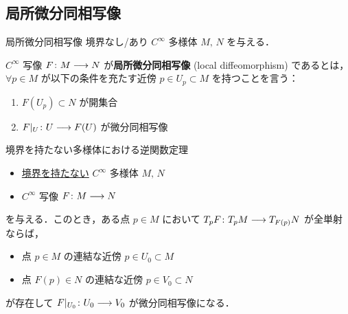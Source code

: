 \documentclass[TQFT_main]{subfiles}
\begin{document}
\subsection{局所微分同相写像}

\begin{mydef}[label=def:loc-diffeo]{局所微分同相写像}
    境界なし/あり $C^\infty$ 多様体 $M,\, N$ を与える．
    
    $C^\infty$ 写像 $F \colon M \longrightarrow N$ が\textbf{局所微分同相写像} (local diffeomorphism) であるとは，
    $\forall p \in M$ が以下の条件を充たす近傍 $p \in U_p \subset M$ を持つことを言う：
    \begin{enumerate}
        \item $F(U_p) \subset N$ が開集合
        \item $F|_U \colon U \longrightarrow F(U)$ が微分同相写像
    \end{enumerate}
\end{mydef}

\begin{mytheo}[label=thm:inverse-function]{境界を持たない多様体における逆関数定理}
    \begin{itemize}
        \item \underline{境界を持たない} $C^\infty$ 多様体 $M,\, N$
        \item $C^\infty$ 写像 $F \colon M \longrightarrow N$
    \end{itemize}
    を与える．このとき，ある点 $p \in M$ において $T_p F \colon T_p M \longrightarrow T_{F(p)} N$ が全単射ならば，
    \begin{itemize}
        \item 点 $p \in M$ の連結な近傍 $p \in U_0 \subset M$
        \item 点 $F(p) \in N$ の連結な近傍 $p \in V_0 \subset N$
    \end{itemize}
    が存在して $F|_{U_0} \colon U_0 \longrightarrow V_0$ が微分同相写像になる．
\end{mytheo}
\end{document}
